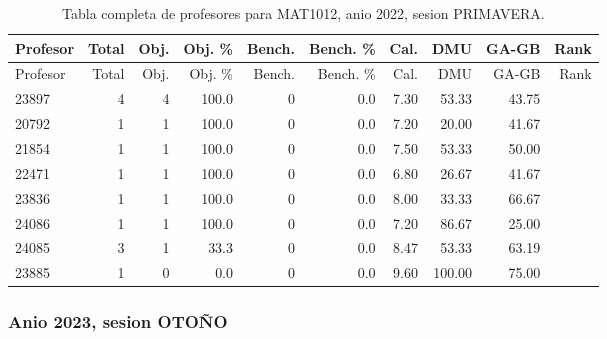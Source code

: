 \begingroup
\scriptsize
\setlength{\tabcolsep}{3pt}
\begin{longtable}{lrrrrrrrrr}
\caption{Tabla completa de profesores para MAT1012, anio 2022, sesion PRIMAVERA.}\label{tab:prof-period-mat1012-2022-primavera-especializado}\\
\toprule
Profesor & Total & Obj. & Obj. \% & Bench. & Bench. \% & Cal. & DMU & GA-GB & Rank \\
\midrule
\endfirsthead
\toprule
Profesor & Total & Obj. & Obj. \% & Bench. & Bench. \% & Cal. & DMU & GA-GB & Rank \\
\midrule
\endhead
23897 & 4 & 4 & 100.0 & 0 & 0.0 & 7.30 & 53.33 & 43.75 &  \\
20792 & 1 & 1 & 100.0 & 0 & 0.0 & 7.20 & 20.00 & 41.67 &  \\
21854 & 1 & 1 & 100.0 & 0 & 0.0 & 7.50 & 53.33 & 50.00 &  \\
22471 & 1 & 1 & 100.0 & 0 & 0.0 & 6.80 & 26.67 & 41.67 &  \\
23836 & 1 & 1 & 100.0 & 0 & 0.0 & 8.00 & 33.33 & 66.67 &  \\
24086 & 1 & 1 & 100.0 & 0 & 0.0 & 7.20 & 86.67 & 25.00 &  \\
24085 & 3 & 1 & 33.3 & 0 & 0.0 & 8.47 & 53.33 & 63.19 &  \\
23885 & 1 & 0 & 0.0 & 0 & 0.0 & 9.60 & 100.00 & 75.00 &  \\
\bottomrule
\end{longtable}
\endgroup

\subsubsection{Anio 2023, sesion OTOÑO}

